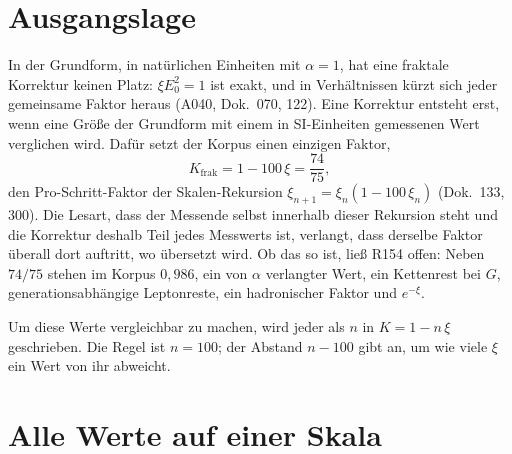 \section{Ausgangslage}

In der Grundform, in natürlichen Einheiten mit $\alpha=1$, hat eine fraktale Korrektur keinen
Platz: $\xi E_0^2=1$ ist exakt, und in Verhältnissen kürzt sich jeder gemeinsame Faktor heraus
(A040, Dok.~070, 122). Eine Korrektur entsteht erst, wenn eine Größe der Grundform mit einem in
SI-Einheiten gemessenen Wert verglichen wird. Dafür setzt der Korpus einen einzigen Faktor,
\begin{equation}
  K_{\text{frak}}=1-100\,\xi=\frac{74}{75},
\end{equation}
den Pro-Schritt-Faktor der Skalen-Rekursion $\xi_{n+1}=\xi_n(1-100\,\xi_n)$ (Dok.~133, 300). Die
Lesart, dass der Messende selbst innerhalb dieser Rekursion steht und die Korrektur deshalb Teil
jedes Messwerts ist, verlangt, dass derselbe Faktor überall dort auftritt, wo übersetzt wird. Ob das
so ist, ließ R154 offen: Neben $74/75$ stehen im Korpus $0{,}986$, ein von $\alpha$ verlangter Wert,
ein Kettenrest bei $G$, generationsabhängige Leptonreste, ein hadronischer Faktor und $e^{-\xi}$.

Um diese Werte vergleichbar zu machen, wird jeder als $n$ in $K=1-n\,\xi$ geschrieben. Die Regel ist
$n=100$; der Abstand $n-100$ gibt an, um wie viele $\xi$ ein Wert von ihr abweicht.

\section{Alle Werte auf einer Skala}

